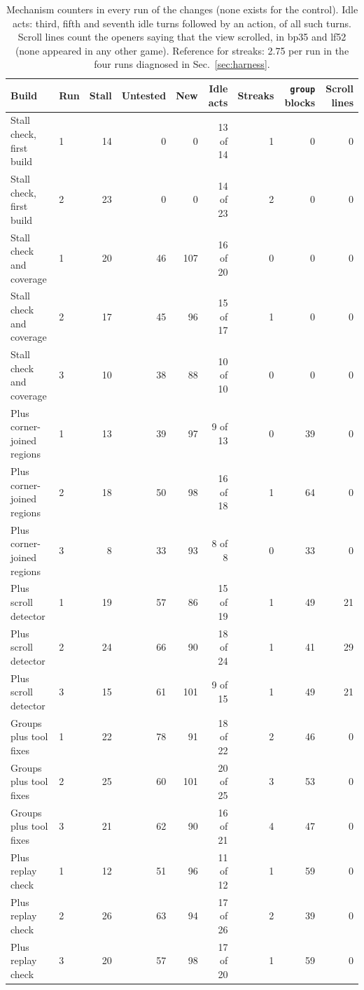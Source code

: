\begin{table}[!htb]
\caption{Mechanism counters in every run of the changes (none exists for the control). Idle acts: third, fifth and seventh idle turns followed by an action, of all such turns. Scroll lines count the openers saying that the view scrolled, in bp35 and lf52 (none appeared in any other game). Reference for streaks: 2.75 per run in the four runs diagnosed in Sec.~\ref{sec:harness}.}\label{tab:harnesscount} %
\centering\footnotesize
\setlength{\tabcolsep}{3pt}
\begin{tabular}{@{}llrrrrrrr@{}}
\toprule
Build & Run & Stall & Untested & New & Idle acts & Streaks & \texttt{group} blocks & Scroll lines \\
\midrule
Stall check, first build & 1 & 14 & 0 & 0 & 13 of 14 & 1 & 0 & 0 \\
Stall check, first build & 2 & 23 & 0 & 0 & 14 of 23 & 2 & 0 & 0 \\
Stall check and coverage & 1 & 20 & 46 & 107 & 16 of 20 & 0 & 0 & 0 \\
Stall check and coverage & 2 & 17 & 45 & 96 & 15 of 17 & 1 & 0 & 0 \\
Stall check and coverage & 3 & 10 & 38 & 88 & 10 of 10 & 0 & 0 & 0 \\
Plus corner-joined regions & 1 & 13 & 39 & 97 & 9 of 13 & 0 & 39 & 0 \\
Plus corner-joined regions & 2 & 18 & 50 & 98 & 16 of 18 & 1 & 64 & 0 \\
Plus corner-joined regions & 3 & 8 & 33 & 93 & 8 of 8 & 0 & 33 & 0 \\
Plus scroll detector & 1 & 19 & 57 & 86 & 15 of 19 & 1 & 49 & 21 \\
Plus scroll detector & 2 & 24 & 66 & 90 & 18 of 24 & 1 & 41 & 29 \\
Plus scroll detector & 3 & 15 & 61 & 101 & 9 of 15 & 1 & 49 & 21 \\
Groups plus tool fixes & 1 & 22 & 78 & 91 & 18 of 22 & 2 & 46 & 0 \\
Groups plus tool fixes & 2 & 25 & 60 & 101 & 20 of 25 & 3 & 53 & 0 \\
Groups plus tool fixes & 3 & 21 & 62 & 90 & 16 of 21 & 4 & 47 & 0 \\
Plus replay check & 1 & 12 & 51 & 96 & 11 of 12 & 1 & 59 & 0 \\
Plus replay check & 2 & 26 & 63 & 94 & 17 of 26 & 2 & 39 & 0 \\
Plus replay check & 3 & 20 & 57 & 98 & 17 of 20 & 1 & 59 & 0 \\
\bottomrule
\end{tabular}
\end{table}

